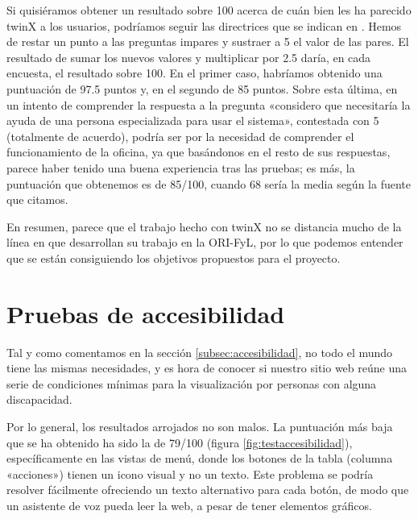 Si quisiéramos obtener un resultado sobre 100 acerca de cuán bien les ha parecido twinX a los usuarios, podríamos seguir las directrices que se indican en \cite{susscore}. Hemos de restar un punto a las preguntas impares y sustraer a 5 el valor de las pares. El resultado de sumar los nuevos valores y multiplicar por 2.5 daría, en cada encuesta, el resultado sobre 100. En el primer caso, habríamos obtenido una puntuación de 97.5 puntos y, en el segundo de 85 puntos. Sobre esta última, en un intento de comprender la respuesta a la pregunta «considero que necesitaría la ayuda de una persona especializada para usar el sistema», contestada con 5 (totalmente de acuerdo), podría ser por la necesidad de comprender el funcionamiento de la oficina, ya que basándonos en el resto de sus respuestas, parece haber tenido una buena experiencia tras las pruebas; es más, la puntuación que obtenemos es de 85/100, cuando 68 sería la media según la fuente que citamos.

En resumen, parece que el trabajo hecho con twinX no se distancia mucho de la línea en que desarrollan su trabajo en la ORI-FyL, por lo que podemos entender que se están consiguiendo los objetivos propuestos para el proyecto.

\section{Pruebas de accesibilidad}

Tal y como comentamos en la sección \ref{subsec:accesibilidad}, no todo el mundo tiene las mismas necesidades, y es hora de conocer si nuestro sitio web reúne una serie de condiciones mínimas para la visualización por personas con alguna discapacidad.

Por lo general, los resultados arrojados no son malos. La puntuación más baja que se ha obtenido ha sido la de 79/100 (figura \ref{fig:testaccesibilidad}), específicamente en las vistas de menú, donde los botones de la tabla (columna «acciones») tienen un icono visual y no un texto. Este problema se podría resolver fácilmente ofreciendo un texto alternativo para cada botón, de modo que un asistente de voz pueda leer la web, a pesar de tener elementos gráficos.


